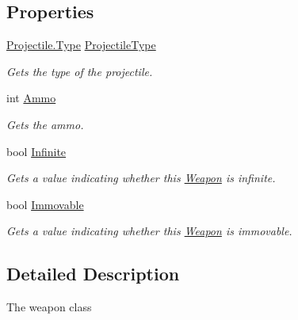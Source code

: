 \subsection*{Properties}
\begin{DoxyCompactItemize}
\item 
\hyperlink{classXaria_1_1Projectile_a2f223d18f3b68ae549d974125826b78d}{Projectile.\+Type} \hyperlink{classXaria_1_1Weapon_af1e4e7a9323d47a63a264f2c18acb07b}{Projectile\+Type}
\begin{DoxyCompactList}\small\item\em Gets the type of the projectile. \end{DoxyCompactList}\item 
int \hyperlink{classXaria_1_1Weapon_ac71f37812ae3f4e4cab4b44ee379d302}{Ammo}
\begin{DoxyCompactList}\small\item\em Gets the ammo. \end{DoxyCompactList}\item 
bool \hyperlink{classXaria_1_1Weapon_a2bcadab6d4981b28dcd81e2971c2f692}{Infinite}
\begin{DoxyCompactList}\small\item\em Gets a value indicating whether this \hyperlink{classXaria_1_1Weapon}{Weapon} is infinite. \end{DoxyCompactList}\item 
bool \hyperlink{classXaria_1_1Weapon_acd1e242b2456cf076c580dba2137fbd9}{Immovable}
\begin{DoxyCompactList}\small\item\em Gets a value indicating whether this \hyperlink{classXaria_1_1Weapon}{Weapon} is immovable. \end{DoxyCompactList}\end{DoxyCompactItemize}


\subsection{Detailed Description}
The weapon class 



